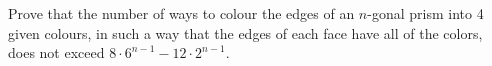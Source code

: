 \problem
Prove that the number of ways to colour the edges of an $n$-gonal prism into 4 given colours, in such a way that the edges of each face have all of the colors, does not exceed $8 \cdot 6^{n-1} - 12 \cdot 2^{n-1}$.
\solution
\endproblem
